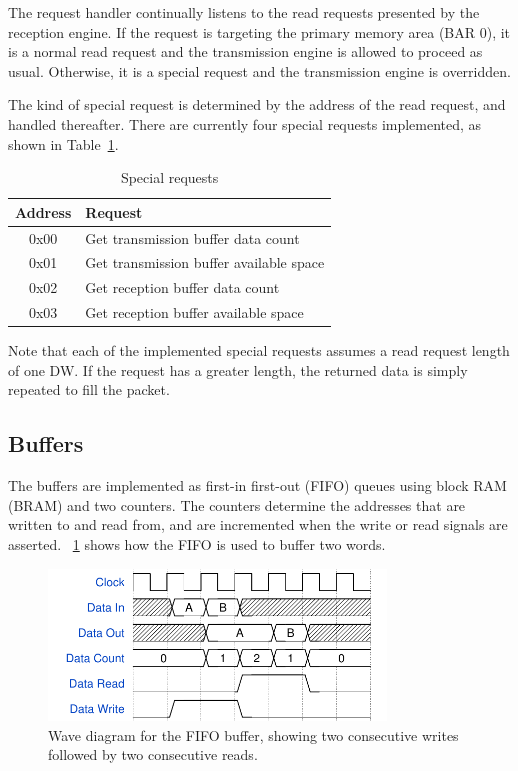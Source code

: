 The request handler continually listens to the read requests presented by the reception engine.
If the request is targeting the primary memory area (BAR 0), it is a normal read request and the transmission engine is allowed to proceed as usual.
Otherwise, it is a special request and the transmission engine is overridden.

The kind of special request is determined by the address of the read request, and handled thereafter.
There are currently four special requests implemented, as shown in Table~\ref{tab:requests}.

\begin{table}[!ht]
    \renewcommand{\arraystretch}{1.3}
    \label{tab:requests}
    \centering
    \begin{tabular}{c|l}
        \bfseries Address & \bfseries Request \\
        \hline
        0x00 & Get transmission buffer data count \\
        0x01 & Get transmission buffer available space \\
        0x02 & Get reception buffer data count \\
        0x03 & Get reception buffer available space \\
    \end{tabular}
    \caption{Special requests}
\end{table}

Note that each of the implemented special requests assumes a read request length of one DW.
If the request has a greater length, the returned data is simply repeated to fill the packet.

\subsection{Buffers}

The buffers are implemented as first-in first-out (FIFO) queues using block RAM (BRAM) and two counters.
The counters determine the addresses that are written to and read from, and are incremented when the write or read signals are asserted.
\figurename~\ref{fig:wavediagram-fifo} shows how the FIFO is used to buffer two words.

\begin{figure}[!ht]
    \centering
    \includegraphics[width=0.80\textwidth]{figures/wavediagram-fifo}
    \caption{Wave diagram for the FIFO buffer, showing two consecutive writes followed by two consecutive reads.}
    \label{fig:wavediagram-fifo}
\end{figure}

